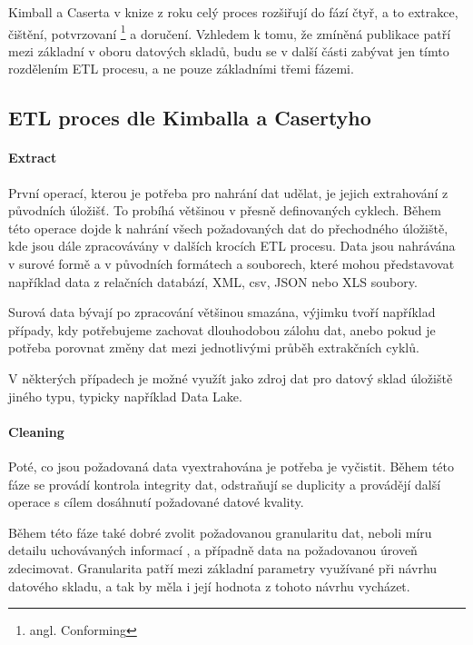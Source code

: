 \documentclass[
  digital,     %
  twoside,     %
  lof,         %
  lot,         %
]{fithesis4}
\begin{document}
Kimball a Caserta v knize  z roku \citeyear{Kimballc2004} celý proces rozšiřují do fází čtyř, a to extrakce, čištění, potvrzovaní \footnote{angl. Conforming} a doručení. Vzhledem k tomu, že zmíněná publikace patří mezi základní v oboru datových skladů, budu se v další části zabývat jen tímto rozdělením ETL
procesu, a ne pouze základními třemi fázemi.

\subsection{ETL proces dle Kimballa a Casertyho}
\paragraph{Extract}
První operací, kterou je potřeba pro nahrání dat udělat, je jejich extrahování z původních úložišť. To probíhá většinou v přesně definovaných cyklech. Během této operace dojde k nahrání všech požadovaných dat do přechodného úložiště, kde jsou dále zpracovávány v dalších krocích ETL procesu. Data jsou nahrávána v surové formě a v původních formátech a souborech, které mohou představovat například data z relačních databází, XML, csv, JSON nebo XLS soubory.\parencite[s.~18]{Kimballc2004}

Surová data bývají po zpracování většinou smazána, výjimku tvoří například případy, kdy potřebujeme zachovat dlouhodobou zálohu dat, anebo pokud je potřeba porovnat změny dat mezi jednotlivými průběh extrakčních cyklů.\parencite[s.~18]{Kimballc2004}

V některých případech je možné využít jako zdroj dat pro datový sklad úložiště jiného typu, typicky například Data Lake.

\paragraph{Cleaning}
Poté, co jsou požadovaná data vyextrahována je potřeba je vyčistit. Během této fáze se provádí kontrola integrity dat, odstraňují se duplicity a provádějí další operace s cílem dosáhnutí požadované datové kvality.\parencite[s.~18-19]{Kimballc2004}

Během této fáze také dobré zvolit požadovanou granularitu dat, neboli míru detailu uchovávaných informací \parencite[s.~41]{Inmon2005}, a případně data na požadovanou úroveň zdecimovat. Granularita patří mezi základní parametry využívané při návrhu datového skladu, a tak by měla i její hodnota z tohoto návrhu vycházet.\parencite[s.~41]{Inmon2005}
\end{document}
